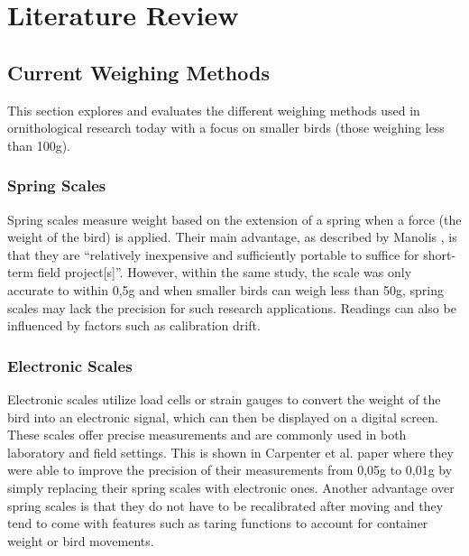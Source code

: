 \documentclass[class=report,11pt,crop=false]{standalone}
\begin{document}
\ifstandalone
\tableofcontents
\fi
\chapter{Literature Review \label{ch:literature}}
\vspace{0.5cm}
\section{Current Weighing Methods}
This section explores and evaluates the different weighing methods used in ornithological research today with a focus on smaller birds (those weighing less than 100g).

\subsection{Spring Scales}
Spring scales measure weight based on the extension of a spring when a force (the weight of the bird) is applied. Their main advantage, as described by Manolis \cite{manoils2024simple}, is that they are “relatively inexpensive and sufficiently portable to suffice for short-term field project[s]”. However, within the same study, the scale was only accurate to within 0,5g and when smaller birds can weigh less than 50g, spring scales may lack the precision for such research applications. Readings can also be influenced by factors such as calibration drift.

\subsection{Electronic Scales}
Electronic scales utilize load cells or strain gauges to convert the weight of the bird into an electronic signal, which can then be displayed on a digital screen. These scales offer precise measurements and are commonly used in both laboratory and field settings. This is shown in Carpenter et al. \cite{carpenter1983weight} paper where they were able to improve the precision of their measurements from 0,05g to 0,01g by simply replacing their spring scales with electronic ones. Another advantage over spring scales is that they do not have to be recalibrated after moving \cite{carpenter1983weight} and they tend to come with features such as taring functions to account for container weight or bird movements.
\end{document}
